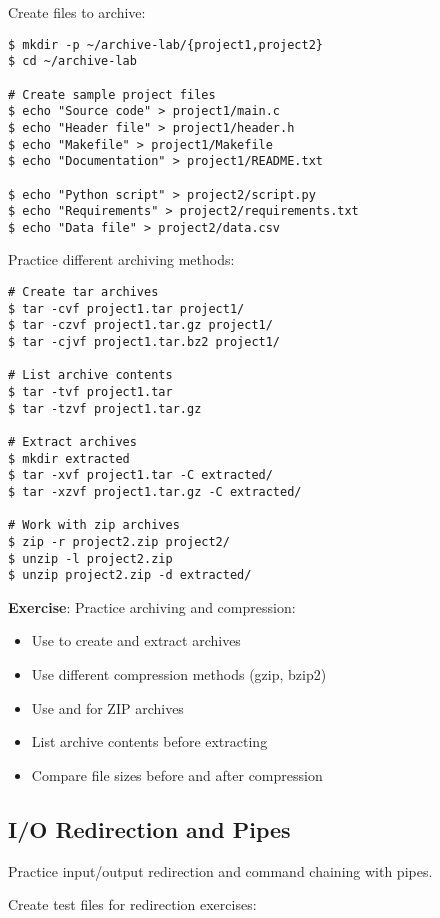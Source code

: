 Create files to archive:

\begin{lstlisting}[style=bashstyle]
$ mkdir -p ~/archive-lab/{project1,project2}
$ cd ~/archive-lab

# Create sample project files
$ echo "Source code" > project1/main.c
$ echo "Header file" > project1/header.h
$ echo "Makefile" > project1/Makefile
$ echo "Documentation" > project1/README.txt

$ echo "Python script" > project2/script.py
$ echo "Requirements" > project2/requirements.txt
$ echo "Data file" > project2/data.csv
\end{lstlisting}

Practice different archiving methods:

\begin{lstlisting}[style=bashstyle]
# Create tar archives
$ tar -cvf project1.tar project1/
$ tar -czvf project1.tar.gz project1/
$ tar -cjvf project1.tar.bz2 project1/

# List archive contents
$ tar -tvf project1.tar
$ tar -tzvf project1.tar.gz

# Extract archives
$ mkdir extracted
$ tar -xvf project1.tar -C extracted/
$ tar -xzvf project1.tar.gz -C extracted/

# Work with zip archives
$ zip -r project2.zip project2/
$ unzip -l project2.zip
$ unzip project2.zip -d extracted/
\end{lstlisting}

\textbf{Exercise}: Practice archiving and compression:
\begin{itemize}
    \item Use  to create and extract archives
    \item Use different compression methods (gzip, bzip2)
    \item Use  and  for ZIP archives
    \item List archive contents before extracting
    \item Compare file sizes before and after compression
\end{itemize}

\subsection{I/O Redirection and Pipes}

Practice input/output redirection and command chaining with pipes.

Create test files for redirection exercises:

